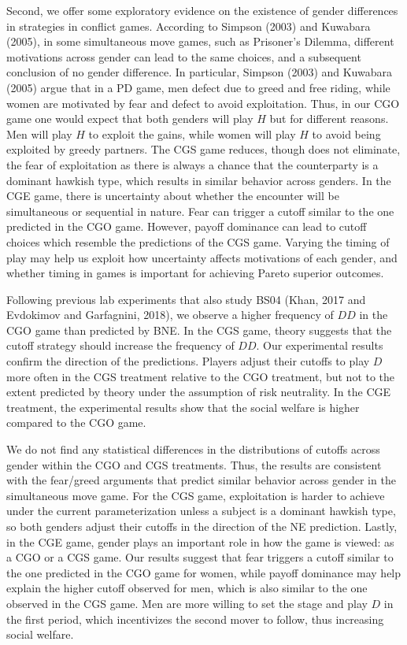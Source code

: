 \documentclass[12pt, letterpaper]{article}
\theoremstyle{plain}
\begin{document}
Second, we offer some exploratory evidence on the existence of gender differences in strategies in conflict games.  According to Simpson (2003) and Kuwabara (2005), in some simultaneous move games, such as Prisoner's Dilemma, different motivations across gender can lead to the same choices, and a subsequent conclusion of no gender difference. In particular, Simpson (2003) and Kuwabara (2005) argue that in a PD game, men defect due to greed and free riding, while women are motivated by fear and defect to avoid exploitation. Thus, in our CGO game one would expect that both genders will play $H$ but for different reasons. Men will play $H$ to exploit the gains, while women will play $H$ to avoid being exploited by greedy partners. The CGS game reduces, though does not eliminate, the fear of exploitation as there is always a chance that the counterparty is a dominant hawkish type, which results in similar behavior across genders. In the CGE game, there is uncertainty about whether the encounter will be simultaneous or sequential in nature. Fear can trigger a cutoff similar to the one predicted in the CGO game. However, payoff dominance can lead to cutoff choices which resemble the predictions of the CGS game. Varying the timing of play may help us exploit how uncertainty affects motivations of each gender, and whether timing in games is important for achieving Pareto superior outcomes.

Following previous lab experiments that also study BS04 (Khan, 2017 and Evdokimov and Garfagnini, 2018), we observe a higher frequency of $DD$ in the CGO game than predicted by BNE. In the CGS game, theory suggests that the cutoff strategy should increase the frequency of $DD$. Our experimental results confirm the direction of the predictions. Players adjust their cutoffs to play $D$ more often in the CGS treatment relative to the CGO treatment, but not to the extent predicted by theory under the assumption of risk neutrality. In the CGE treatment, the experimental results show that the social welfare is higher compared to the CGO game.

We do not find any statistical differences in the distributions of cutoffs across gender within the CGO and CGS treatments. Thus, the results are consistent with the fear/greed arguments that predict similar behavior across gender in the simultaneous move game. For the CGS game, exploitation is harder to achieve under the current parameterization unless a subject is a dominant hawkish type, so both genders adjust their cutoffs in the direction of the NE prediction. Lastly, in the CGE game, gender plays an important role in how the game is viewed: as a CGO or a CGS game. Our results suggest that fear triggers a cutoff similar to the one predicted in the CGO game for women, while payoff dominance may help explain the higher cutoff observed for men, which is also similar to the one observed in the CGS game. Men are more willing to set the stage and play $D$ in the first period, which incentivizes the second mover to follow, thus increasing social welfare. 
\end{document}
